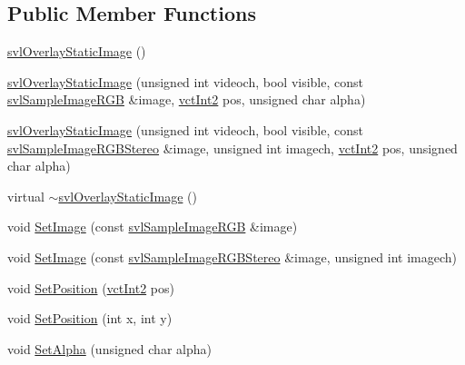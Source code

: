 \subsection*{Public Member Functions}
\begin{DoxyCompactItemize}
\item 
\hyperlink{classsvl_overlay_static_image_a16034a16d371013c7c81e1fc8fcdaf41}{svl\-Overlay\-Static\-Image} ()
\item 
\hyperlink{classsvl_overlay_static_image_a8d60b03852534484b972081fea7252c6}{svl\-Overlay\-Static\-Image} (unsigned int videoch, bool visible, const \hyperlink{svl_sample_image_types_8h_a54a55112dd3879f71f990d2945375f1a}{svl\-Sample\-Image\-R\-G\-B} \&image, \hyperlink{vct_fixed_size_vector_types_8h_add8c88eb6a432b15f14b866b9c35325f}{vct\-Int2} pos, unsigned char alpha)
\item 
\hyperlink{classsvl_overlay_static_image_afd9c8a45c6aa0f9be402106fd2b3f43d}{svl\-Overlay\-Static\-Image} (unsigned int videoch, bool visible, const \hyperlink{svl_sample_image_types_8h_a60d5c2bc1f2158093ff6588911cecc2b}{svl\-Sample\-Image\-R\-G\-B\-Stereo} \&image, unsigned int imagech, \hyperlink{vct_fixed_size_vector_types_8h_add8c88eb6a432b15f14b866b9c35325f}{vct\-Int2} pos, unsigned char alpha)
\item 
virtual \hyperlink{classsvl_overlay_static_image_a7656e74203942e9b886da47644b3c6b2}{$\sim$svl\-Overlay\-Static\-Image} ()
\item 
void \hyperlink{classsvl_overlay_static_image_a2cefc6561381eac828b1a9beaf9bbc8c}{Set\-Image} (const \hyperlink{svl_sample_image_types_8h_a54a55112dd3879f71f990d2945375f1a}{svl\-Sample\-Image\-R\-G\-B} \&image)
\item 
void \hyperlink{classsvl_overlay_static_image_a20b91c43c2c9dcc1cad04fe337dad6dc}{Set\-Image} (const \hyperlink{svl_sample_image_types_8h_a60d5c2bc1f2158093ff6588911cecc2b}{svl\-Sample\-Image\-R\-G\-B\-Stereo} \&image, unsigned int imagech)
\item 
void \hyperlink{classsvl_overlay_static_image_a75fa4808eb278c01c04011219197780b}{Set\-Position} (\hyperlink{vct_fixed_size_vector_types_8h_add8c88eb6a432b15f14b866b9c35325f}{vct\-Int2} pos)
\item 
void \hyperlink{classsvl_overlay_static_image_aa2c9039314d3d615c1add5a6f4eb2dd2}{Set\-Position} (int x, int y)
\item 
void \hyperlink{classsvl_overlay_static_image_a7ea726748d5a3b929d9d96aaf3b1f307}{Set\-Alpha} (unsigned char alpha)
\item 

\end{DoxyCompactItemize}
